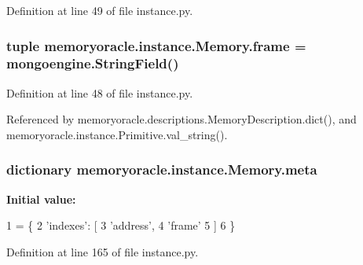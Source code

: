 Definition at line 49 of file instance.\+py.

\hypertarget{classmemoryoracle_1_1instance_1_1Memory_afd58f13b2c1054f498e32b6643fbd82e}{}
\subsubsection[{frame}]{\setlength{\rightskip}{0pt plus 5cm}tuple memoryoracle.\+instance.\+Memory.\+frame = mongoengine.\+String\+Field()\hspace{0.3cm}{\ttfamily [static]}}\label{classmemoryoracle_1_1instance_1_1Memory_afd58f13b2c1054f498e32b6643fbd82e}


Definition at line 48 of file instance.\+py.



Referenced by memoryoracle.\+descriptions.\+Memory\+Description.\+dict(), and memoryoracle.\+instance.\+Primitive.\+val\+\_\+string().

\hypertarget{classmemoryoracle_1_1instance_1_1Memory_afebefc428546a963dbfab8ffcae72e8a}{}
\subsubsection[{meta}]{\setlength{\rightskip}{0pt plus 5cm}dictionary memoryoracle.\+instance.\+Memory.\+meta\hspace{0.3cm}{\ttfamily [static]}}\label{classmemoryoracle_1_1instance_1_1Memory_afebefc428546a963dbfab8ffcae72e8a}
{\bfseries Initial value\+:}
\begin{DoxyCode}
1 = \{
2         \textcolor{stringliteral}{'indexes'}: [
3             \textcolor{stringliteral}{'address'},
4             \textcolor{stringliteral}{'frame'}
5         ]
6     \}
\end{DoxyCode}


Definition at line 165 of file instance.\+py.

\hypertarget{classmemoryoracle_1_1instance_1_1Memory_a00f51174e05bcbaa2d0ec3faccbaffaa}{}
